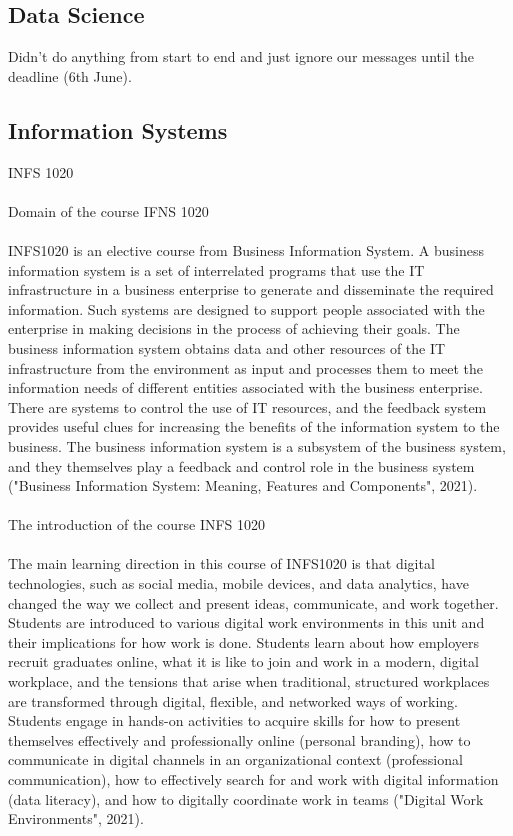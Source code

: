 \documentclass{article}
\begin{document}
	\subsection{Data Science}
	Didn't do anything from start to end and just ignore our messages until the deadline (6th June).
	\subsection{Information Systems}
	INFS 1020 \\
	\\
	Domain of the course IFNS 1020 \\
	\\
	INFS1020 is an elective course from Business Information System. A business information system is a set of interrelated programs that use the IT infrastructure in a business enterprise to generate and disseminate the required information. Such systems are designed to support people associated with the enterprise in making decisions in the process of achieving their goals. The business information system obtains data and other resources of the IT infrastructure from the environment as input and processes them to meet the information needs of different entities associated with the business enterprise. There are systems to control the use of IT resources, and the feedback system provides useful clues for increasing the benefits of the information system to the business. The business information system is a subsystem of the business system, and they themselves play a feedback and control role in the business system ("Business Information System: Meaning, Features and Components", 2021). \\
	\\
	The introduction of the course INFS 1020 \\
	\\
	The main learning direction in this course of INFS1020 is that digital technologies, such as social media, mobile devices, and data analytics, have changed the way we collect and present ideas, communicate, and work together. Students are introduced to various digital work environments in this unit and their implications for how work is done. Students learn about how employers recruit graduates online, what it is like to join and work in a modern, digital workplace, and the tensions that arise when traditional, structured workplaces are transformed through digital, flexible, and networked ways of working. Students engage in hands-on activities to acquire skills for how to present themselves effectively and professionally online (personal branding), how to communicate in digital channels in an organizational context (professional communication), how to effectively search for and work with digital information (data literacy), and how to digitally coordinate work in teams ("Digital Work Environments", 2021). \\
\end{document}
